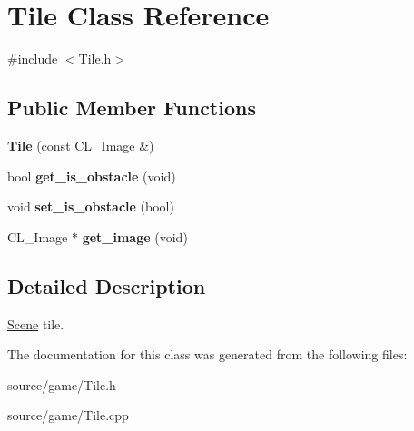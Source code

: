 \hypertarget{classTile}{
\section{Tile Class Reference}
\label{classTile}
}


{\ttfamily \#include $<$Tile.h$>$}

\subsection*{Public Member Functions}
\begin{DoxyCompactItemize}
\item 
\hypertarget{classTile_ad6be5c474119fc1e4d897359fafd1fef}{
{\bfseries Tile} (const CL\_\-Image \&)}
\label{classTile_ad6be5c474119fc1e4d897359fafd1fef}

\item 
\hypertarget{classTile_a9ffe8caabad37fd485070650f5687103}{
bool {\bfseries get\_\-is\_\-obstacle} (void)}
\label{classTile_a9ffe8caabad37fd485070650f5687103}

\item 
\hypertarget{classTile_a13e034f5037a4d574a31575015dc8a68}{
void {\bfseries set\_\-is\_\-obstacle} (bool)}
\label{classTile_a13e034f5037a4d574a31575015dc8a68}

\item 
\hypertarget{classTile_a54dcf924b3d88f643a5ba415545b5b58}{
CL\_\-Image $\ast$ {\bfseries get\_\-image} (void)}
\label{classTile_a54dcf924b3d88f643a5ba415545b5b58}

\end{DoxyCompactItemize}


\subsection{Detailed Description}
\hyperlink{classScene}{Scene} tile. 

The documentation for this class was generated from the following files:\begin{DoxyCompactItemize}
\item 
source/game/Tile.h\item 
source/game/Tile.cpp\end{DoxyCompactItemize}
